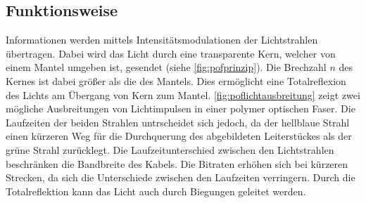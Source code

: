 \subsection{Funktionsweise}
\label{subsec:poffunktionsweise}

Informationen werden mittels Intensitätsmodulationen der Lichtstrahlen
übertragen. Dabei wird das Licht durch eine transparente Kern, welcher von einem
Mantel umgeben ist, gesendet (siehe \autoref{fig:pofprinzip}). Die Brechzahl $n$
des Kernes ist dabei größer als die des Mantels. Dies ermöglicht eine
Totalreflexion des Lichts am Übergang von Kern zum Mantel.
\autoref{fig:poflichtausbreitung} zeigt zwei mögliche Ausbreitungen von
Lichtimpulsen in einer polymer optischen Faser. Die Laufzeiten der beiden
Strahlen untrscheidet sich jedoch, da der hellblaue Strahl einen kürzeren Weg
für die Durchquerung des abgebildeten Leiterstückes als der grüne Strahl
zurücklegt. Die Laufzeitunterschied zwischen den Lichtstrahlen beschränken die
Bandbreite des Kabels. Die Bitraten erhöhen sich bei kürzeren Strecken, da sich
die Unterschiede zwischen den Laufzeiten verringern. Durch die Totalreflektion
kann das Licht auch durch Biegungen geleitet werden.


